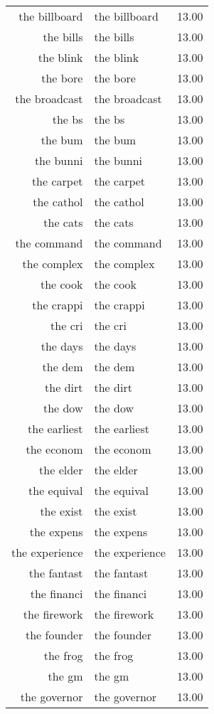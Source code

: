 \begin{table}[ht]
\begin{tabular}{rlr}
  the billboard & the billboard & 13.00 \\ 
  the bills & the bills & 13.00 \\ 
  the blink & the blink & 13.00 \\ 
  the bore & the bore & 13.00 \\ 
  the broadcast & the broadcast & 13.00 \\ 
  the bs & the bs & 13.00 \\ 
  the bum & the bum & 13.00 \\ 
  the bunni & the bunni & 13.00 \\ 
  the carpet & the carpet & 13.00 \\ 
  the cathol & the cathol & 13.00 \\ 
  the cats & the cats & 13.00 \\ 
  the command & the command & 13.00 \\ 
  the complex & the complex & 13.00 \\ 
  the cook & the cook & 13.00 \\ 
  the crappi & the crappi & 13.00 \\ 
  the cri & the cri & 13.00 \\ 
  the days & the days & 13.00 \\ 
  the dem & the dem & 13.00 \\ 
  the dirt & the dirt & 13.00 \\ 
  the dow & the dow & 13.00 \\ 
  the earliest & the earliest & 13.00 \\ 
  the econom & the econom & 13.00 \\ 
  the elder & the elder & 13.00 \\ 
  the equival & the equival & 13.00 \\ 
  the exist & the exist & 13.00 \\ 
  the expens & the expens & 13.00 \\ 
  the experience & the experience & 13.00 \\ 
  the fantast & the fantast & 13.00 \\ 
  the financi & the financi & 13.00 \\ 
  the firework & the firework & 13.00 \\ 
  the founder & the founder & 13.00 \\ 
  the frog & the frog & 13.00 \\ 
  the gm & the gm & 13.00 \\ 
  the governor & the governor & 13.00 \\ 

\end{tabular}
\end{table}
